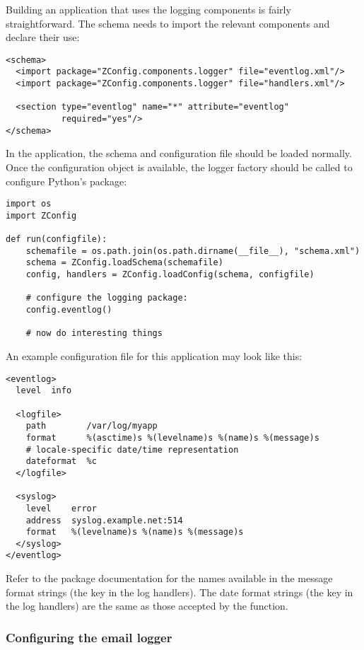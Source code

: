 \documentclass{howto}
\begin{document}
Building an application that uses the logging components is fairly
straightforward.  The schema needs to import the relevant components
and declare their use:

\begin{verbatim}
<schema>
  <import package="ZConfig.components.logger" file="eventlog.xml"/>
  <import package="ZConfig.components.logger" file="handlers.xml"/>

  <section type="eventlog" name="*" attribute="eventlog"
           required="yes"/>
</schema>
\end{verbatim}

In the application, the schema and configuration file should be loaded
normally.  Once the configuration object is available, the logger
factory should be called to configure Python's  package:

\begin{verbatim}
import os
import ZConfig

def run(configfile):
    schemafile = os.path.join(os.path.dirname(__file__), "schema.xml")
    schema = ZConfig.loadSchema(schemafile)
    config, handlers = ZConfig.loadConfig(schema, configfile)

    # configure the logging package:
    config.eventlog()

    # now do interesting things
\end{verbatim}

An example configuration file for this application may look like this:

\begin{verbatim}
<eventlog>
  level  info

  <logfile>
    path        /var/log/myapp
    format      %(asctime)s %(levelname)s %(name)s %(message)s
    # locale-specific date/time representation
    dateformat  %c
  </logfile>

  <syslog>
    level    error
    address  syslog.example.net:514
    format   %(levelname)s %(name)s %(message)s
  </syslog>
</eventlog>
\end{verbatim}

Refer to the  package documentation for the names
available in the message format strings (the  key in the
log handlers).  The date format strings (the  key in
the log handlers) are the same as those accepted by the
 function.

\subsubsection{Configuring the email logger}
\end{document}
